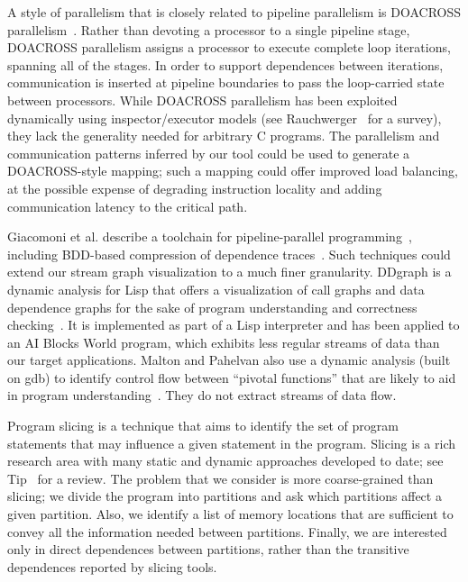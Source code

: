 A style of parallelism that is closely related to pipeline parallelism
is DOACROSS parallelism~\cite{padua80highspeed,cytron86doacross}.
Rather than devoting a processor to a single pipeline stage, DOACROSS
parallelism assigns a processor to execute complete loop iterations,
spanning all of the stages.  In order to support dependences between
iterations, communication is inserted at pipeline boundaries to pass
the loop-carried state between processors.  While DOACROSS parallelism
has been exploited dynamically using inspector/executor models (see
Rauchwerger~\cite{rauchwerger98runtime} for a survey), they lack the
generality needed for arbitrary C programs.  The parallelism and
communication patterns inferred by our tool could be used to generate
a DOACROSS-style mapping; such a mapping could offer improved load
balancing, at the possible expense of degrading instruction locality
and adding communication latency to the critical path.

Giacomoni et al. describe a toolchain for pipeline-parallel
programming~\cite{giacomoni07toolchain}, including BDD-based
compression of dependence traces~\cite{price06bdds}.  Such techniques
could extend our stream graph visualization to a much finer
granularity. 
DDgraph is a dynamic analysis for Lisp that offers a visualization of
call graphs and data dependence graphs for the sake of program
understanding and correctness checking~\cite{balmas05ddgraph}.  It is
implemented as part of a Lisp interpreter and has been applied to an
AI Blocks World program, which exhibits less regular streams of data
than our target applications.  Malton and Pahelvan also use a dynamic
analysis (built on gdb) to identify control flow between ``pivotal
functions'' that are likely to aid in program
understanding~\cite{malton05recovery}.  They do not extract streams of
data flow.

Program slicing is a technique that aims to identify the set of
program statements that may influence a given statement in the
program.  Slicing is a rich research area with many static and dynamic
approaches developed to date; see Tip~\cite{tip95slice} for a review.
The problem that we consider is more coarse-grained than slicing; we
divide the program into partitions and ask which partitions affect a
given partition.  Also, we identify a list of memory locations that
are sufficient to convey all the information needed between
partitions.  Finally, we are interested only in direct dependences
between partitions, rather than the transitive dependences reported by
slicing tools.


